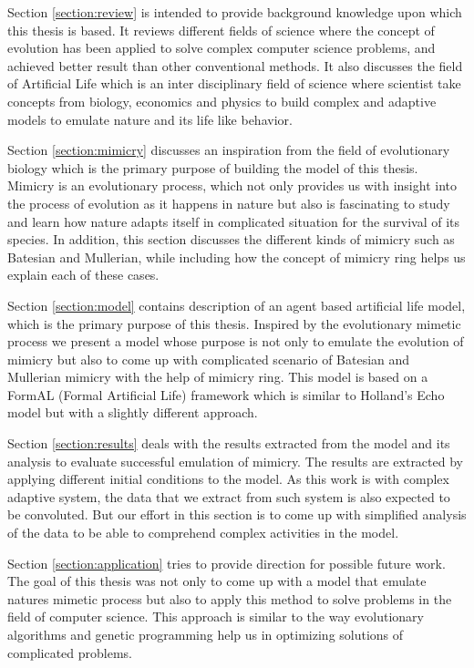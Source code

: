 \documentclass[letterpaper]{article}
\numberwithin{equation}{section}
\begin{document}
Section \ref{section:review} is intended to provide background knowledge upon which this thesis is based. It reviews different fields of science where the concept of evolution has been applied to solve complex computer science problems, and achieved better result than other conventional methods. It also discusses the field of Artificial Life which is an inter disciplinary field of science where scientist take concepts from biology, economics and physics to build complex and adaptive models to emulate nature and its life like behavior.

Section \ref{section:mimicry} discusses an inspiration from the field of evolutionary biology which is the primary purpose of building the model of this thesis. Mimicry is an evolutionary process, which not only provides us with insight into the process of evolution as it happens in nature but also is fascinating to study and learn how nature adapts itself in complicated situation for the survival of its species. In addition, this section discusses the different kinds of mimicry such as Batesian and Mullerian, while including how the concept of mimicry ring helps us explain each of these cases. 

Section \ref{section:model} contains description of an agent based artificial life model, which is the primary purpose of this thesis. Inspired by the evolutionary mimetic process we present a model whose purpose is not only to emulate the evolution of mimicry but also to come up with complicated scenario of Batesian and Mullerian mimicry with the help of mimicry ring. This model is based on a FormAL (Formal Artificial Life) framework which is similar to Holland's Echo model but with a slightly different approach. 

Section \ref{section:results} deals with the results extracted from the model and its analysis to evaluate successful emulation of mimicry. The results are extracted by applying different initial conditions to the model. As this work is with complex adaptive system, the data that we extract from such system is also expected to be convoluted. But our effort in this section is to come up with simplified analysis of the data to be able to comprehend complex activities in the model. 

Section \ref{section:application} tries to provide direction for possible future work. The goal of this thesis was not only to come up with a model that emulate natures mimetic process but also to apply this method to solve problems in the field of computer science. This approach is similar to the way evolutionary algorithms and genetic programming help us in optimizing solutions of complicated problems. 
\end{document}
